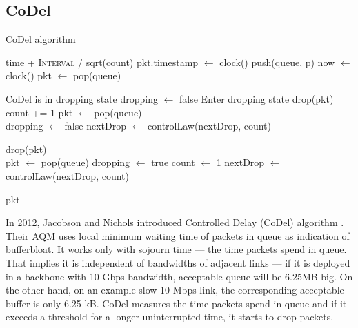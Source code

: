 \subsection{CoDel}
\label{CoDel}

\algnewcommand\And{}
\begin{algorithm}[p]
	\caption{CoDel algorithm}
	\label{alg:CoDel}
	\begin{algorithmic}
			\State \Return time + \textsc{Interval} / sqrt(count)
		\EndFunction
			\State pkt.timestamp $\leftarrow$ clock()
			\State push(queue, p)
		\EndFunction
			\State now $\leftarrow$ clock()
			\State pkt $\leftarrow$ pop(queue)
			
			 \Comment CoDel is in dropping state
				\State {} \vspace{3px}
				\State dropping $\leftarrow$ false \Comment Enter dropping state
			\EndIf
			\State {}
				\State drop(pkt)
				\State count += 1
				\State pkt $\leftarrow$ pop(queue)
				\\
					\State dropping $\leftarrow$ false
				\Else
					\State nextDrop $\leftarrow$ controlLaw(nextDrop, count)
				\EndIf	
			\EndWhile 
		
				\State drop(pkt)
				\\
				\State pkt $\leftarrow$ pop(queue)
				\State dropping $\leftarrow$ true
				\State count $\leftarrow$ 1
				\State nextDrop $\leftarrow$ controlLaw(nextDrop, count)
		
			\EndIf
			\State \Return pkt
		\EndFunction
		
	\end{algorithmic}
\end{algorithm}

In 2012, Jacobson and Nichols introduced Controlled Delay (CoDel) algorithm \cite{CoDel}. Their AQM uses local minimum waiting time of packets in queue as indication of bufferbloat. It works only with sojourn time --- the time packets spend in queue. That implies it is independent of bandwidths of adjacent links --- if it is deployed in a backbone with 10 Gbps bandwidth, acceptable queue will be 6.25MB big. On the other hand, on an example slow 10 Mbps link, the corresponding acceptable buffer is only 6.25 kB. CoDel measures the time packets spend in queue and if it exceeds a threshold for a longer uninterrupted time, it starts to drop packets.

